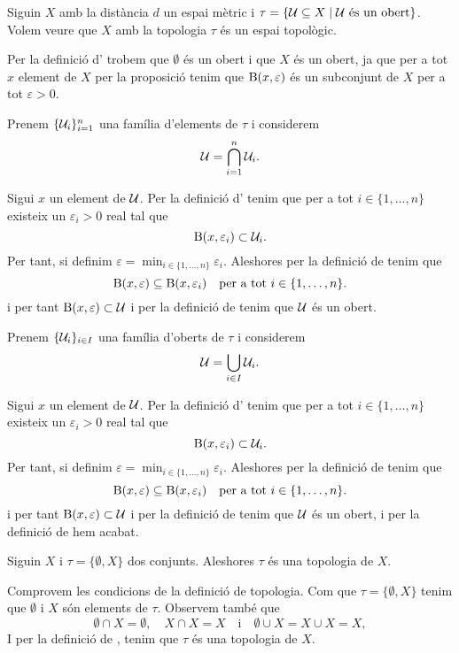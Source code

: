 \documentclass[../Apunts.tex]{subfiles}
\begin{document}
	\begin{example}
		\label{ex:topologia induida per una mètrica}
		Siguin \(X\) amb la distància \(d\) un espai mètric i \(\tau=\{\mathcal{U}\subseteq X\mid \mathcal{U}\text{ és un obert}\}\). Volem veure que \(X\) amb la topologia \(\tau\) és un espai topològic.
		\begin{solution}
			Per la definició d' trobem que \(\emptyset\) és un obert i que \(X\) és un obert, ja que per a tot \(x\) element de \(X\) per la proposició  tenim que \(\operatorname{B}(x,\varepsilon)\) és un subconjunt de \(X\) per a tot \(\varepsilon>0\).
			
			Prenem \(\{\mathcal{U}_{i}\}_{i=1}^{n}\) una família d'elements de \(\tau\) i considerem
			\[\mathcal{U}=\bigcap_{i=1}^{n}\mathcal{U}_{i}.\]
			
			Sigui \(x\) un element de \(\mathcal{U}\). Per la definició d' tenim que per a tot \(i\in\{1,\dots,n\}\) existeix un \(\varepsilon_{i}>0\) real tal que
			\[\operatorname{B}(x,\varepsilon_{i})\subset\mathcal{U}_{i}.\]
			Per tant, si definim \(\varepsilon=\min_{i\in\{1,\dots,n\}}\varepsilon_{i}\). Aleshores per la definició de  tenim que
			\[\operatorname{B}(x,\varepsilon)\subseteq\operatorname{B}(x,\varepsilon_{i})\quad\text{per a tot }i\in\{1,\dots,n\}.\]
			i per tant \(\operatorname{B}(x,\varepsilon)\subset\mathcal{U}\) i per la definició de  tenim que \(\mathcal{U}\) és un obert.
			
			Prenem \(\{\mathcal{U}_{i}\}_{i\in I}\) una família d'oberts de \(\tau\) i considerem
			\[\mathcal{U}=\bigcup_{i\in I}\mathcal{U}_{i}.\]
			
			Sigui \(x\) un element de \(\mathcal{U}\). Per la definició d' tenim que per a tot \(i\in\{1,\dots,n\}\) existeix un \(\varepsilon_{i}>0\) real tal que
			\[\operatorname{B}(x,\varepsilon_{i})\subset\mathcal{U}_{i}.\]
			Per tant, si definim \(\varepsilon=\min_{i\in\{1,\dots,n\}}\varepsilon_{i}\). Aleshores per la definició de  tenim que
			\[\operatorname{B}(x,\varepsilon)\subseteq\operatorname{B}(x,\varepsilon_{i})\quad\text{per a tot }i\in\{1,\dots,n\}.\]
			i per tant \(\operatorname{B}(x,\varepsilon)\subset\mathcal{U}\) i per la definició de  tenim que \(\mathcal{U}\) és un obert, i per la definició de  hem acabat.
		\end{solution}
	\end{example}
	\begin{example}
		\label{ex:topologia grollera}
		Siguin \(X\) i \(\tau=\{\emptyset,X\}\) dos conjunts. Aleshores \(\tau\) és una topologia de \(X\).
		\begin{solution}
			Comprovem les condicions de la definició de topologia. Com que \(\tau=\{\emptyset,X\}\) tenim que \(\emptyset\) i \(X\) són elements de \(\tau\). Observem també que
			\[\emptyset\cap X=\emptyset,\quad X\cap X=X\quad\text{i}\quad\emptyset\cup X=X\cup X=X,\]
			I per la definició de , tenim que \(\tau\) és una topologia de \(X\).
		\end{solution}
	\end{example}
\end{document}
